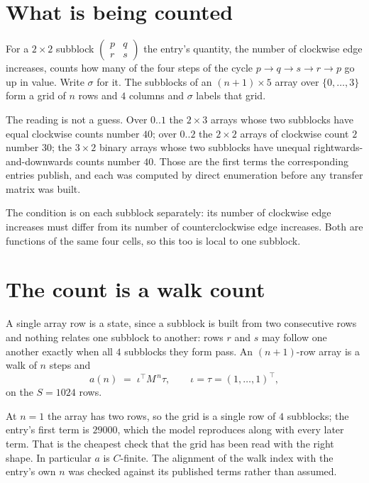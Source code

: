 \documentclass[11pt,a4paper]{article}
\theoremstyle{plain}
\theoremstyle{definition}
\begin{document}
\section{What is being counted}

For a $2\times2$ subblock $\begin{pmatrix}p&q\\r&s\end{pmatrix}$ the
entry's quantity, the number of clockwise edge increases, counts how many of the four steps of the cycle $p\to q\to s\to r\to p$ go up in value. Write $\sigma$ for it. The subblocks of an
$(n+1)\times5$ array over $\{0,\dots,3\}$ form a grid of $n$ rows and $4$
columns and $\sigma$ labels that grid.

The reading is not a guess. Over $0..1$ the $2\times3$ arrays whose two subblocks have equal
clockwise counts number $40$; over $0..2$ the $2\times2$ arrays of clockwise count $2$ number
$30$; the $3\times2$ binary arrays whose two subblocks have unequal rightwards-and-downwards
counts number $40$. Those are the first terms the corresponding entries publish, and each was
computed by direct enumeration before any transfer matrix was built.

The condition is on each subblock separately: its number of clockwise edge increases must differ from its number
of counterclockwise edge increases. Both are functions of the same four cells, so this too is local to one
subblock.

\section{The count is a walk count}

A single array row is a state, since a subblock is built from two
consecutive rows and nothing relates one subblock to another: rows $r$ and $s$ may follow one
another exactly when all $4$ subblocks they form pass. An $(n+1)$-row array is a walk of $n$
steps and
\[
a(n)\;=\;\iota^{\!\top}M^{\,n}\tau,\qquad\iota=\tau=(1,\dots,1)^{\!\top},
\]
on the $S=1024$ rows.

At $n=1$ the array has two rows, so the grid is a single row of $4$
subblocks; the entry's first term is $29000$, which the model
reproduces along with every later term. That is the cheapest check that the grid has been read
with the right shape.
In particular $a$ is $C$-finite. The alignment of the walk index with the entry's own $n$ was
checked against its published terms rather than assumed.
\end{document}
